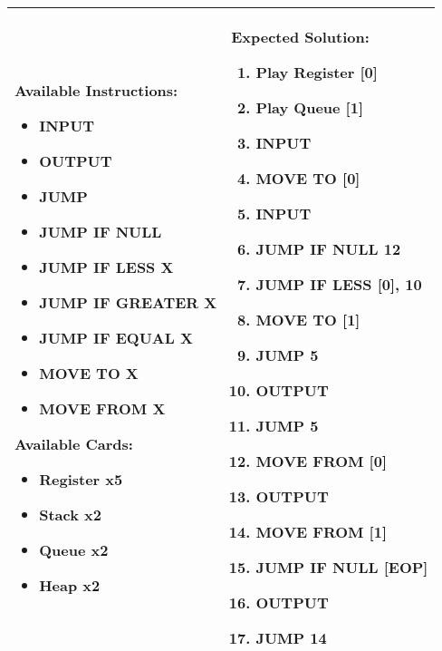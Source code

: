 \begin{center}
    \begin{tabular}{ | m{6cm} | m{8cm} | } 
        \hline
            \textbf{Available Instructions:} 
            \begin{itemize}
                \setlength\itemsep{-.35em}
                \item INPUT
                \item OUTPUT
                \item JUMP
                \item JUMP IF NULL
                \item JUMP IF LESS X
                \item JUMP IF GREATER X
		\item JUMP IF EQUAL X
                \item MOVE TO X
                \item MOVE FROM X
            \end{itemize}
            \textbf{Available Cards:} 
            \begin{itemize}
                \setlength\itemsep{-.35em}
                \item Register x5
		\item Stack x2
                \item Queue x2
                \item Heap x2
            \end{itemize}& 
            \textbf{Expected Solution:} 
            \begin{enumerate}
                \setlength\itemsep{-.35em}
		\item Play Register [0]
                \item Play Queue [1]
                \item INPUT
		\item MOVE TO [0]
		\item INPUT
                \item JUMP IF NULL 12
		\item JUMP IF LESS [0], 10
                \item MOVE TO [1]
                \item JUMP 5
		\item OUTPUT
		\item JUMP 5
                \item MOVE FROM [0]
		\item OUTPUT
		\item MOVE FROM [1]
                \item JUMP IF NULL [EOP]
                \item OUTPUT
                \item JUMP 14
            \end{enumerate}
            \\
        \hline
    \end{tabular}
\end{center}


